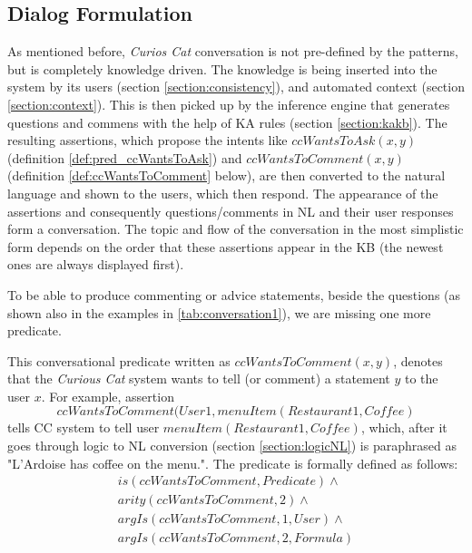 \subsection{Dialog Formulation}
\label{section:dialog}
As mentioned before, \emph{Curios Cat} conversation is not pre-defined by the 
patterns, but is completely knowledge driven. The knowledge is being inserted
into the system by its users (section \ref{section:consistency}), and automated
context (section \ref{section:context}). This is then picked up by the 
inference engine that generates questions and commens with the help of KA rules
(section \ref{section:kakb}). The resulting assertions, which propose the 
intents like $ccWantsToAsk(x,y)$ (definition \ref{def:pred_ccWantsToAsk}) and
$ccWantsToComment(x,y)$ (definition \ref{def:ccWantsToComment} below), 
are then converted to the natural language and shown to the users, which then 
respond. The appearance of the assertions and consequently questions/comments
in NL and their user responses form a conversation. The topic and flow of the 
conversation in the most simplistic form depends on the order that these
assertions appear in the KB (the newest ones are always displayed first).

To be able to produce commenting or advice statements, beside the questions
(as shown also in the examples in \autoref{tab:conversation1}), we are missing
one more predicate.

\begin{definition}
\label{def:pred_ccWantsToComment}
This conversational predicate written as $ccWantsToComment(x,y)$, denotes that 
the \emph{Curious Cat} system wants to tell (or comment) a statement $y$ to
the user $x$. For example, assertion 
\begin{equation*}
ccWantsToComment(User1, menuItem(Restaurant1,Coffee)
\end{equation*}
tells CC system to tell user $menuItem(Restaurant1,Coffee)$, which,
after it goes through logic to NL conversion (section \ref{section:logicNL}) 
is paraphrased as "L'Ardoise has coffee on the menu.". The predicate is 
formally defined as follows:
\begin{equation}\label{as:ccWantsToComment}
\begin{gathered}
	is(ccWantsToComment,Predicate) \land \\
	arity(ccWantsToComment,2) \land\\ 
	argIs(ccWantsToComment,1,User) \land \\
	argIs(ccWantsToComment,2,Formula)
\end{gathered}
\end{equation}
\end{definition}

